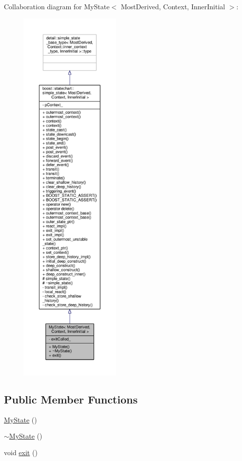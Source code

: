 Collaboration diagram for My\+State$<$ Most\+Derived, Context, Inner\+Initial $>$\+:
\nopagebreak
\begin{figure}[H]
\begin{center}
\leavevmode
\includegraphics[height=550pt]{struct_my_state__coll__graph}
\end{center}
\end{figure}
\subsection*{Public Member Functions}
\begin{DoxyCompactItemize}
\item 
\mbox{\hyperlink{struct_my_state_a0726bf23499177701cd81d59dde63264}{My\+State}} ()
\item 
\mbox{\hyperlink{struct_my_state_a64bb530d3de2fcd5dd4ee1c11d9886e5}{$\sim$\+My\+State}} ()
\item 
void \mbox{\hyperlink{struct_my_state_a7b4389b975201a3773c97e52d16a3a36}{exit}} ()
\end{DoxyCompactItemize}
